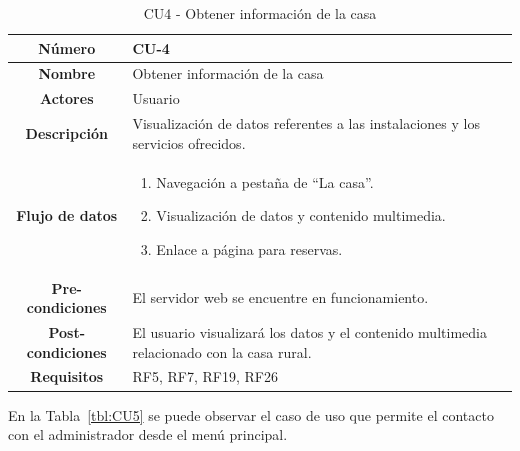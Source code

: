 \begin{table}[h!tb]
	\centering
	\begin{adjustbox}{width=1\textwidth}
	\begin{tabular}{|c|p{\textwidth}|}
		\hline {\bf Número} & CU-4 \\
		\hline {\bf Nombre} & Obtener información de la casa\\
		\hline {\bf Actores} & Usuario \\
		\hline {\bf Descripción} & Visualización de datos referentes a las instalaciones y los servicios ofrecidos. \\
		\hline {\bf Flujo de datos}
		& 
		\begin{enumerate}
			\item Navegación a pestaña de ``La casa''.
            \item Visualización de datos y contenido multimedia.
            \item Enlace a página para reservas.
   
        \end{enumerate}\\
		\hline {\bf Pre-condiciones}
		& El servidor web se encuentre en funcionamiento. \\
		\hline {\bf Post-condiciones}
		& El usuario visualizará los datos y el contenido multimedia relacionado con la casa rural. \\
    
		\hline {\bf Requisitos} & RF5, RF7, RF19, RF26 \\
		\hline 
	\end{tabular}
	\end{adjustbox}
	\caption{CU4 - Obtener información de la casa\label{tbl:CU4}}
\end{table}
En la Tabla~\ref{tbl:CU5} se puede observar el caso de uso que permite el contacto con el administrador desde el menú principal.

